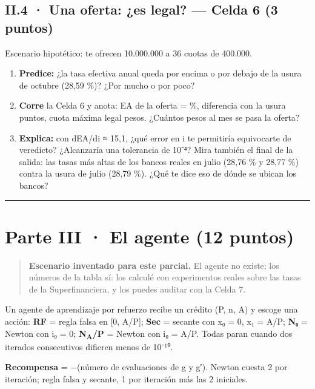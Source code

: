 \subsection{II.4 · Una oferta: ¿es legal? --- Celda 6 (3 puntos)}

Escenario hipotético: te ofrecen 10.000.000 a 36 cuotas de 400.000.

\begin{enumerate}
\def\labelenumi{\alph{enumi})}
\item
  \textbf{Predice:} ¿la tasa efectiva anual queda por encima o por debajo de la usura de octubre (28,59 \%)? ¿Por mucho o por poco?
\item
  \textbf{Corre} la Celda 6 y anota: EA de la oferta =  \%, diferencia con la usura  puntos, cuota máxima legal  pesos. ¿Cuántos pesos al mes se pasa la oferta?
\item
  \textbf{Explica:} con dEA/di ≈ 15,1, ¿qué error en i te permitiría equivocarte de veredicto? ¿Alcanzaría una tolerancia de 10⁻⁴? Mira también el final de la salida: las tasas más altas de los bancos reales en julio (28,76 \% y 28,77 \%) contra la usura de julio (28,79 \%). ¿Qué te dice eso de dónde se ubican los bancos?
\end{enumerate}

\begin{center}\rule{0.5\linewidth}{0.5pt}\end{center}

\section{Parte III · El agente (12 puntos)}

\begin{quote}
\textbf{Escenario inventado para este parcial.} El agente no existe; los números de la tabla sí: los calculé con experimentos reales sobre las tasas de la Superfinanciera, y los puedes auditar con la Celda 7.
\end{quote}

Un agente de aprendizaje por refuerzo recibe un crédito (P, n, A) y escoge una acción:
\textbf{RF} = regla falsa en {[}0, A/P{]}; \textbf{Sec} = secante con x₀ = 0, x₁ = A/P; \textbf{N₀} = Newton con i₀ = 0; \textbf{N\textsubscript{A}/P} = Newton con i₀ = A/P. Todas paran cuando dos iterados consecutivos difieren menos de 10⁻¹⁰.

\textbf{Recompensa} = −(número de evaluaciones de g y g′). Newton cuesta 2 por iteración; regla falsa y secante, 1 por iteración más las 2 iniciales.

